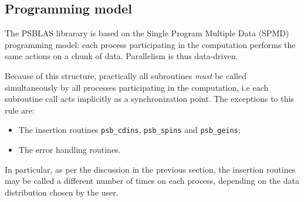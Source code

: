 \subsection{Programming model}

The PSBLAS librarary is based on the Single Program Multiple Data
(SPMD) programming model: each process participating in the
computation performs the same actions on a chunk of data. Parallelism
is thus data-driven. 

Because of this structure, practically all subroutines \emph{must} be
called simultaneously by all processes participating in the
computation, i.e each subroutine call acts implicitly as a
synchronization point. The exceptions to this rule are:
\begin{itemize}
\item The insertion routines \verb|psb_cdins|, \verb|psb_spins| and
  \verb|psb_geins|;
\item The error handling routines.
\end{itemize}
In particular, as per the discussion in the previous section, the
insertion routines may be called a different number of times on each
process, depending on  the data distribution chosen by the user. 

